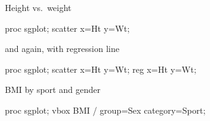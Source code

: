 \documentclass[unknownkeysallowed]{beamer}\usepackage[]{graphicx}\usepackage[]{color}
\begin{document}

\begin{frame}[fragile]{Height vs.\ weight}
  
  \begin{Sascode}[store=gh]
proc sgplot;
  scatter x=Ht y=Wt;
  \end{Sascode}
  
  
\end{frame}

\begin{frame}[fragile]{and again, with regression line}
  
  \begin{Sascode}[store=gj]
proc sgplot;
  scatter x=Ht y=Wt;
  reg x=Ht y=Wt;
  \end{Sascode}
  
  
  
\end{frame}


\begin{frame}[fragile]{BMI by sport and gender}
  
  \begin{Sascode}[store=gi]
proc sgplot;
  vbox BMI / group=Sex category=Sport;
  \end{Sascode}
  
\end{frame}

\end{document}
